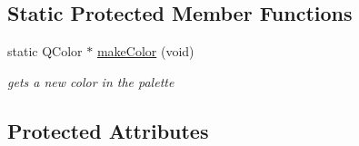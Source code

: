 \subsection*{\-Static \-Protected \-Member \-Functions}
\begin{DoxyCompactItemize}
\item 
static \-Q\-Color $\ast$ \hyperlink{class_g_sort_a03da0205abd58bad6c4a58419cb40568}{make\-Color} (void)
\begin{DoxyCompactList}\small\item\em gets a new color in the palette \end{DoxyCompactList}\end{DoxyCompactItemize}
\subsection*{\-Protected \-Attributes}
